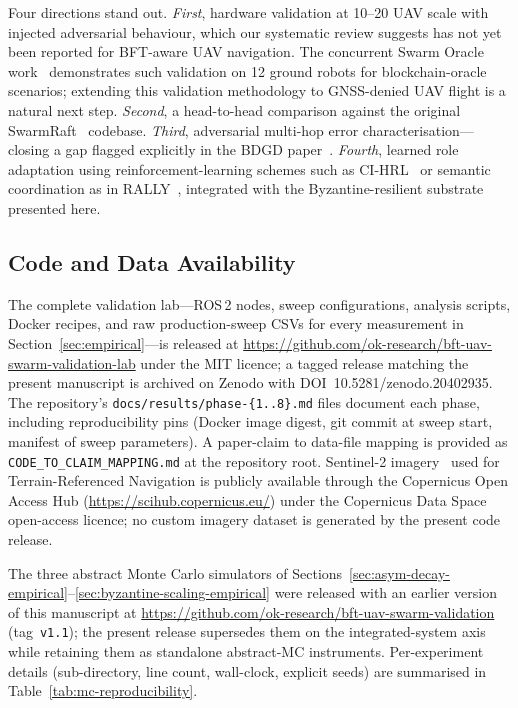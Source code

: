 \documentclass[journal,10pt,twocolumn]{IEEEtran}
\begin{document}
Four directions stand out. \emph{First}, hardware validation at 10--20 UAV scale with injected adversarial behaviour, which our systematic review suggests has not yet been reported for BFT-aware UAV navigation. The concurrent Swarm Oracle work~\cite{pacheco2025swarmoracle} demonstrates such validation on 12 ground robots for blockchain-oracle scenarios; extending this validation methodology to GNSS-denied UAV flight is a natural next step. \emph{Second}, a head-to-head comparison against the original SwarmRaft~\cite{dev2025swarmraft} codebase. \emph{Third}, adversarial multi-hop error characterisation---closing a gap flagged explicitly in the BDGD paper~\cite{zhong2025bdgd}. \emph{Fourth}, learned role adaptation using reinforcement-learning schemes such as CI-HRL~\cite{xiang2025cihrl} or semantic coordination as in RALLY~\cite{wang2025rally}, integrated with the Byzantine-resilient substrate presented here.

\subsection{Code and Data Availability}
\label{sec:code-data}
The complete validation lab---ROS\,2 nodes, sweep configurations, analysis scripts, Docker recipes, and raw production-sweep CSVs for every measurement in Section~\ref{sec:empirical}---is released at \url{https://github.com/ok-research/bft-uav-swarm-validation-lab} under the MIT licence; a tagged release matching the present manuscript is archived on Zenodo with DOI~10.5281/zenodo.20402935. The repository's \texttt{docs/results/phase-\{1..8\}.md} files document each phase, including reproducibility pins (Docker image digest, git commit at sweep start, manifest of sweep parameters). A paper-claim to data-file mapping is provided as \texttt{CODE\_TO\_CLAIM\_MAPPING.md} at the repository root. Sentinel-2 imagery~\cite{drusch2012sentinel} used for Terrain-Referenced Navigation is publicly available through the Copernicus Open Access Hub (\url{https://scihub.copernicus.eu/}) under the Copernicus Data Space open-access licence; no custom imagery dataset is generated by the present code release.

The three abstract Monte Carlo simulators of Sections~\ref{sec:asym-decay-empirical}--\ref{sec:byzantine-scaling-empirical} were released with an earlier version of this manuscript at \url{https://github.com/ok-research/bft-uav-swarm-validation} (tag~\texttt{v1.1}); the present release supersedes them on the integrated-system axis while retaining them as standalone abstract-MC instruments. Per-experiment details (sub-directory, line count, wall-clock, explicit seeds) are summarised in Table~\ref{tab:mc-reproducibility}.
\end{document}
